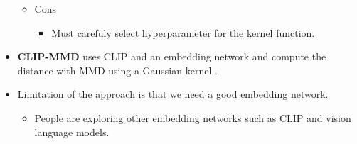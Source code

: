 \documentclass[10pt]{article}
\begin{document}
\begin{itemize}
\begin{itemize}
        \item Cons
        \begin{itemize}
            \item Must carefuly select hyperparameter for the kernel function.
        \end{itemize}
    \end{itemize}

    \item {\bf CLIP-MMD} uses CLIP and an embedding network and compute the distance with MMD using a Gaussian kernel \cite{Jayasumana:2024}.    

    \item Limitation of the approach is that we need a good embedding network.
    \begin{itemize}
        \item People are exploring other embedding networks such as CLIP and vision language models.
    \end{itemize}
\end{itemize}


  
\end{document}
